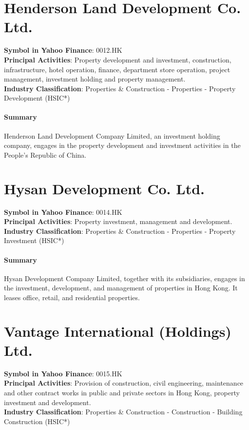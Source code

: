\section{Henderson Land Development Co. Ltd.}
\textbf{Symbol in Yahoo Finance}: 0012.HK\\
\textbf{Principal Activities}: Property development and investment, construction, infrastructure, hotel operation, finance, department store operation, project management, investment holding and property management.\\
\textbf{Industry Classification}: Properties \& Construction - Properties - Property Development (HSIC*)
\paragraph{Summary}
Henderson Land Development Company Limited, an investment holding company, engages in the property development and investment activities in the People's Republic of China.


\section{Hysan Development Co. Ltd.}
\textbf{Symbol in Yahoo Finance}: 0014.HK\\
\textbf{Principal Activities}: Property investment, management and development.\\
\textbf{Industry Classification}: Properties \& Construction - Properties - Property Investment (HSIC*)
\paragraph{Summary}
Hysan Development Company Limited, together with its subsidiaries, engages in the investment, development, and management of properties in Hong Kong. It leases office, retail, and residential properties.


\section{Vantage International (Holdings) Ltd.}
\textbf{Symbol in Yahoo Finance}: 0015.HK\\
\textbf{Principal Activities}: Provision of construction, civil engineering, maintenance and other contract works in public and private sectors in Hong Kong, property investment and development.\\
\textbf{Industry Classification}: Properties \& Construction - Construction - Building Construction (HSIC*)
